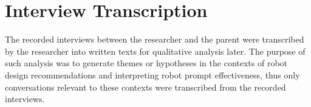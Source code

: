 \section{Interview Transcription}
The recorded interviews between the researcher and the parent were transcribed by the researcher into written texts for qualitative analysis later.  The purpose of such analysis was to generate themes or hypotheses in the contexts of robot design recommendations and interpreting robot prompt effectiveness, thus only conversations relevant to these contexts were transcribed from the recorded interviews.